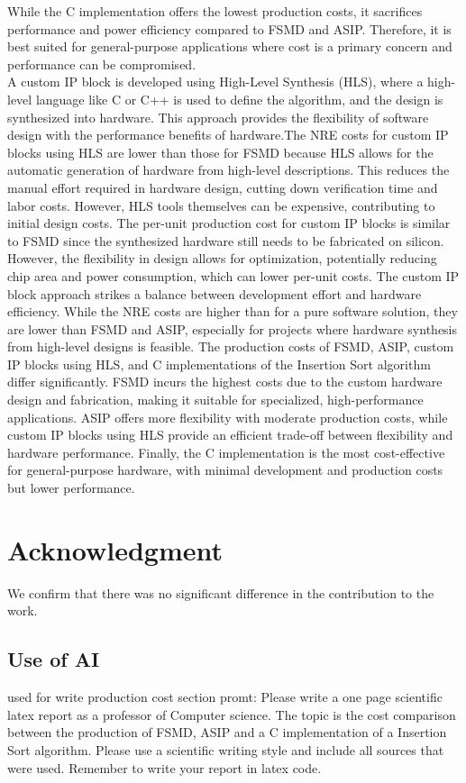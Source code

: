 \documentclass[conference]{IEEEtran}
\begin{document}
While the C implementation offers the lowest production costs, it sacrifices performance and power efficiency compared to FSMD and ASIP. Therefore, it is best suited for general-purpose applications where cost is a primary concern and performance can be compromised.\\
A custom IP block is developed using High-Level Synthesis (HLS), where a high-level language like C or C++ is used to define the algorithm, and the design is synthesized into hardware. This approach provides the flexibility of software design with the performance benefits of hardware.The NRE costs for custom IP blocks using HLS are lower than those for FSMD because HLS allows for the automatic generation of hardware from high-level descriptions. This reduces the manual effort required in hardware design, cutting down verification time and labor costs. However, HLS tools themselves can be expensive, contributing to initial design costs. The per-unit production cost for custom IP blocks is similar to FSMD since the synthesized hardware still needs to be fabricated on silicon. However, the flexibility in design allows for optimization, potentially reducing chip area and power consumption, which can lower per-unit costs. The custom IP block approach strikes a balance between development effort and hardware efficiency. While the NRE costs are higher than for a pure software solution, they are lower than FSMD and ASIP, especially for projects where hardware synthesis from high-level designs is feasible.
The production costs of FSMD, ASIP, custom IP blocks using HLS, and C implementations of the Insertion Sort algorithm differ significantly. FSMD incurs the highest costs due to the custom hardware design and fabrication, making it suitable for specialized, high-performance applications. ASIP offers more flexibility with moderate production costs, while custom IP blocks using HLS provide an efficient trade-off between flexibility and hardware performance. Finally, the C implementation is the most cost-effective for general-purpose hardware, with minimal development and production costs but lower performance. 
\section*{Acknowledgment}

We confirm that there was no significant difference in the contribution to the work.

\printbibliography

\begin{appendices}
\section{Use of AI}
used for write production cost section promt: Please write a one page scientific latex report as a professor of Computer science. The topic is the cost comparison between the production of FSMD, ASIP and a C implementation of a Insertion Sort algorithm. Please use a scientific writing style and include all sources that were used. Remember to write your report in latex code.
\end{appendices}
\end{document}
